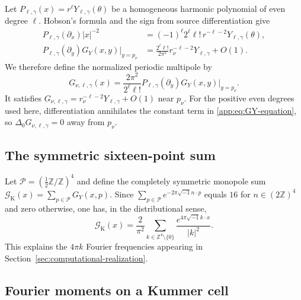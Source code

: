 \documentclass[11pt,a4paper,twoside]{article}
\numberwithin{equation}{section}
\theoremstyle{definition}
\theoremstyle{remark}
\newcommand{\ii}{\sqrt{-1}}
\begin{document}
Let \(P_{\ell,\gamma}(x)=r^\ell Y_{\ell,\gamma}(\theta)\) be a
homogeneous harmonic polynomial of even degree \(\ell\).
Hobson's formula and the sign from source differentiation give
\[
\begin{aligned}
P_{\ell,\gamma}(\partial_x)|x|^{-2}
&=(-1)^\ell2^\ell\ell!\,r^{-\ell-2}Y_{\ell,\gamma}(\theta),\\
P_{\ell,\gamma}(\partial_y)G_Y(x,y)\big|_{y=p_\nu}
&=\frac{2^\ell\ell!}{2\pi^2}
r_\nu^{-\ell-2}Y_{\ell,\gamma}+O(1).
\end{aligned}
\]
We therefore define the normalized periodic multipole by
\begin{equation}\label{app:eq:multipole}
G_{\nu,\ell,\gamma}(x)=\frac{2\pi^2}{2^\ell\ell!}
P_{\ell,\gamma}(\partial_y)G_Y(x,y)\big|_{y=p_\nu}.
\end{equation}
It satisfies
\(G_{\nu,\ell,\gamma}=r_\nu^{-\ell-2}Y_{\ell,\gamma}+O(1)\)
near \(p_\nu\). For the positive even degrees used here,
differentiation annihilates the constant term in
\eqref{app:eq:GY-equation}, so
\(\Delta_0G_{\nu,\ell,\gamma}=0\) away from \(p_\nu\).

\subsection{The symmetric sixteen-point sum}

Let \(\mathcal P=(\frac12\mathbb Z/\mathbb Z)^4\) and define the
completely symmetric monopole sum
\(\mathcal G_{\mathrm K}(x)=\sum_{p\in\mathcal P}G_Y(x,p)\).
Since \(\sum_{p\in\mathcal P}e^{-2\pi\ii n\cdot p}\) equals
\(16\) for \(n\in(2\mathbb Z)^4\) and zero otherwise,
one has, in the distributional sense,
\[
\mathcal G_{\mathrm K}(x)=\frac2{\pi^2}
\sum_{k\in\mathbb Z^4\setminus\{0\}}
\frac{e^{4\pi\ii k\cdot x}}{|k|^2}.
\]
This explains the \(4\pi k\) Fourier frequencies appearing in
Section~\ref{sec:computational-realization}.

\subsection{Fourier moments on a Kummer cell}
\end{document}
